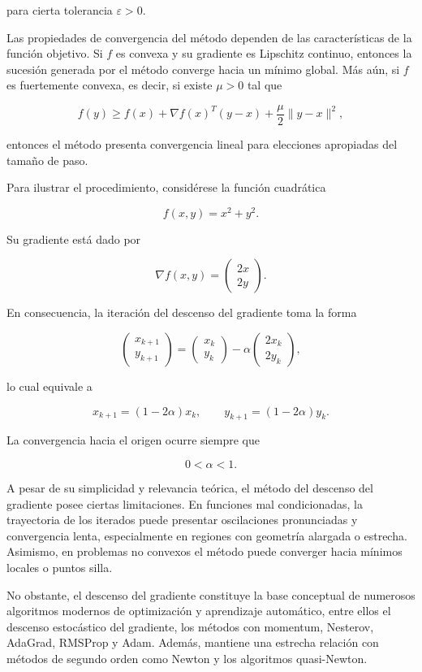 \documentclass[
  spanish,
  us-letterpaper,
  DIV=11,
  numbers=noendperiod]{scrreprt}
\begin{document}
para cierta tolerancia \(\varepsilon > 0\).

Las propiedades de convergencia del método dependen de las
características de la función objetivo. Si \(f\) es convexa y su
gradiente es Lipschitz continuo, entonces la sucesión generada por el
método converge hacia un mínimo global. Más aún, si \(f\) es fuertemente
convexa, es decir, si existe \(\mu>0\) tal que

\[
f(y)
\geq
f(x)
+
\nabla f(x)^T(y-x)
+
\frac{\mu}{2}\|y-x\|^2,
\]

entonces el método presenta convergencia lineal para elecciones
apropiadas del tamaño de paso.

Para ilustrar el procedimiento, considérese la función cuadrática

\[
f(x,y)=x^2+y^2.
\]

Su gradiente está dado por

\[
\nabla f(x,y)
=
\begin{pmatrix}
2x\\
2y
\end{pmatrix}.
\]

En consecuencia, la iteración del descenso del gradiente toma la forma

\[
\begin{pmatrix}
x_{k+1}\\
y_{k+1}
\end{pmatrix}
=
\begin{pmatrix}
x_k\\
y_k
\end{pmatrix}
-
\alpha
\begin{pmatrix}
2x_k\\
2y_k
\end{pmatrix},
\]

lo cual equivale a

\[
x_{k+1}=(1-2\alpha)x_k,
\qquad
y_{k+1}=(1-2\alpha)y_k.
\]

La convergencia hacia el origen ocurre siempre que

\[
0<\alpha<1.
\]

A pesar de su simplicidad y relevancia teórica, el método del descenso
del gradiente posee ciertas limitaciones. En funciones mal
condicionadas, la trayectoria de los iterados puede presentar
oscilaciones pronunciadas y convergencia lenta, especialmente en
regiones con geometría alargada o estrecha. Asimismo, en problemas no
convexos el método puede converger hacia mínimos locales o puntos silla.

No obstante, el descenso del gradiente constituye la base conceptual de
numerosos algoritmos modernos de optimización y aprendizaje automático,
entre ellos el descenso estocástico del gradiente, los métodos con
momentum, Nesterov, AdaGrad, RMSProp y Adam. Además, mantiene una
estrecha relación con métodos de segundo orden como Newton y los
algoritmos quasi-Newton.
\end{document}
